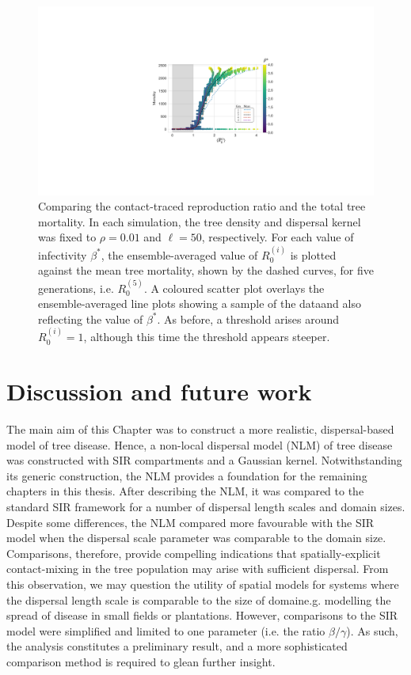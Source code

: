 \begin{figure}
    \centering
    \includegraphics[scale=0.6]{chapter5/figures/fig6-R0-contact-vs-mortality.pdf}
    \caption{Comparing the contact-traced reproduction ratio and the total tree mortality. 
    In each simulation, the tree density and dispersal kernel was fixed to $\rho=0.01$ and $\ell=50$, respectively. 
    For each value of infectivity $\beta^*$, the ensemble-averaged value of $R_0^{(i)}$ is plotted against the mean tree mortality, shown by the dashed curves, for five generations, i.e. $R_{0}^{(5)}$.
    A coloured scatter plot overlays the ensemble-averaged line plots showing a sample of the data\textemdash and also reflecting the value of $\beta^*$.
    As before, a threshold arises around $R_0^{(i)} = 1$, although this time the threshold appears steeper.}
    \label{fig:contact-trace-vs-mortality}
\end{figure}

\newpage
\section{Discussion and future work}

The main aim of this Chapter was to construct a more realistic, dispersal-based model of tree disease.
Hence, a non-local dispersal model (NLM) of tree disease was constructed with SIR compartments and a Gaussian kernel.
Notwithstanding its generic construction, the NLM provides a foundation for the remaining chapters in this thesis.
After describing the NLM, it was compared to the standard SIR framework for a number of dispersal length scales and domain sizes.
Despite some differences, the NLM compared more favourable with the SIR model when the dispersal scale parameter was comparable to the domain size.
Comparisons, therefore, provide compelling indications that spatially-explicit contact-mixing in the tree population may arise with sufficient dispersal.
From this observation, we may question the utility of spatial models for systems where the dispersal length scale is comparable to the size of domain\textemdash e.g. modelling the spread of disease in small fields or plantations. However, comparisons to the SIR model were simplified and limited to one parameter (i.e. the ratio $\beta/\gamma$). As such, the analysis constitutes a preliminary result, and a more sophisticated comparison method is required to glean further insight.

